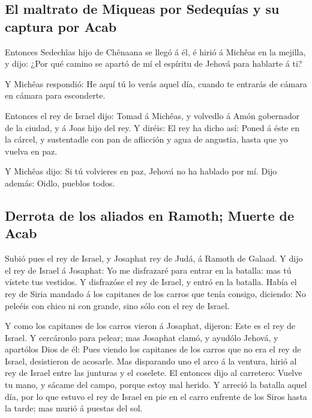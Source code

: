 \hypertarget{el-maltrato-de-miqueas-por-sedequuxedas-y-su-captura-por-acab}{%
\subsection{El maltrato de Miqueas por Sedequías y su captura por
Acab}\label{el-maltrato-de-miqueas-por-sedequuxedas-y-su-captura-por-acab}}

 Entonces Sedechîas hijo de Chênaana se llegó á él, é hirió
á Michêas en la mejilla, y dijo: ¿Por qué camino se apartó de mí el
espíritu de Jehová para hablarte á ti?

 Y Michêas respondió: He aquí tú lo verás aquel día, cuando
te entrarás de cámara en cámara para esconderte.

 Entonces el rey de Israel dijo: Tomad á Michêas, y
volvedlo á Amón gobernador de la ciudad, y á Joas hijo del rey.
 Y diréis: El rey ha dicho así: Poned á éste en la cárcel,
y sustentadle con pan de aflicción y agua de angustia, hasta que yo
vuelva en paz.

 Y Michêas dijo: Si tú volvieres en paz, Jehová no ha
hablado por mí. Dijo además: Oidlo, pueblos todos.

\hypertarget{derrota-de-los-aliados-en-ramoth-muerte-de-acab}{%
\subsection{Derrota de los aliados en Ramoth; Muerte de
Acab}\label{derrota-de-los-aliados-en-ramoth-muerte-de-acab}}

 Subió pues el rey de Israel, y Josaphat rey de Judá, á
Ramoth de Galaad.  Y dijo el rey de Israel á Josaphat: Yo
me disfrazaré para entrar en la batalla: mas tú vístete tus vestidos. Y
disfrazóse el rey de Israel, y entró en la batalla.  Había
el rey de Siria mandado á los capitanes de los carros que tenía consigo,
diciendo: No peleéis con chico ni con grande, sino sólo con el rey de
Israel.

 Y como los capitanes de los carros vieron á Josaphat,
dijeron: Este es el rey de Israel. Y cercáronlo para pelear; mas
Josaphat clamó, y ayudólo Jehová, y apartólos Dios de él: 
Pues viendo los capitanes de los carros que no era el rey de Israel,
desistieron de acosarle.  Mas disparando uno el arco á la
ventura, hirió al rey de Israel entre las junturas y el coselete. El
entonces dijo al carretero: Vuelve tu mano, y sácame del campo, porque
estoy mal herido.  Y arreció la batalla aquel día, por lo
que estuvo el rey de Israel en pie en el carro enfrente de los Siros
hasta la tarde; mas murió á puestas del sol.

